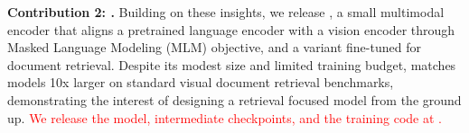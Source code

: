 



\noindent\textbf{Contribution 2: \flagship{}.}\; Building on these insights, we release \flagship{}, a small \flagshipparameters{} multimodal encoder that aligns a pretrained language encoder with a vision encoder through Masked Language Modeling (MLM) objective, and \colflagship{} a variant fine-tuned for document retrieval. Despite its modest size and limited training budget, \colflagship{} matches models 10x larger on standard visual document retrieval benchmarks, demonstrating the interest of designing a retrieval focused model from the ground up. 
\textcolor{red}{We release the model, intermediate checkpoints, and the training code at \repo.}




